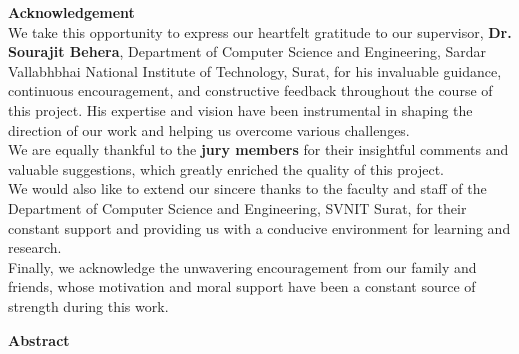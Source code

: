 \documentclass[12pt, a4paper]{report}
\begin{document}
\vfill
\begin{center}
\end{center}

\newpage
\thispagestyle{empty}

\vfill
\begin{center}
\begin{minipage}{0.85\textwidth}
    \centering
    
    {\Large \textbf{Acknowledgement}} \\[1.2cm]

    \justifying
    \noindent We take this opportunity to express our heartfelt gratitude to our supervisor, 
    \textbf{Dr. Sourajit Behera}, Department of Computer Science and Engineering, 
    Sardar Vallabhbhai National Institute of Technology, Surat, for his invaluable guidance, 
    continuous encouragement, and constructive feedback throughout the course of this project. 
    His expertise and vision have been instrumental in shaping the direction of our work and 
    helping us overcome various challenges. \\[0.5cm]

    \noindent We are equally thankful to the \textbf{jury members} for their insightful comments and 
    valuable suggestions, which greatly enriched the quality of this project. \\[0.5cm]

    \noindent We would also like to extend our sincere thanks to the faculty and staff of the Department 
    of Computer Science and Engineering, SVNIT Surat, for their constant support and providing 
    us with a conducive environment for learning and research. \\[0.5cm]

    \noindent Finally, we acknowledge the unwavering encouragement from our family and friends, 
    whose motivation and moral support have been a constant source of strength during this work. \\[0.5cm]

\end{minipage}
\end{center}
\vfill

\newpage
{}
\thispagestyle{plain}

\begin{center}
{\Huge \textbf{Abstract}}
\end{center}
\vspace{1cm}
\end{document}
